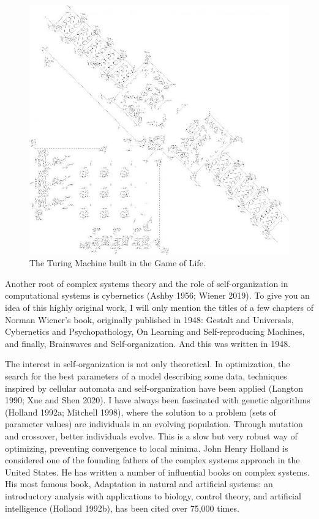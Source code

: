 \documentclass[
  a4paper,
  DIV=11,
  numbers=noendperiod]{scrreprt}
\begin{document}
\begin{figure}

{\centering \includegraphics{media/ch5n/image4.jpg}

}

\caption{\label{fig-ch5n-img4-old-42}The Turing Machine built in the
Game of Life.}

\end{figure}

Another root of complex systems theory and the role of self-organization
in computational systems is cybernetics (Ashby 1956; Wiener 2019). To
give you an idea of this highly original work, I will only mention the
titles of a few chapters of Norman Wiener's book, originally published
in 1948: Gestalt and Universals, Cybernetics and Psychopathology, On
Learning and Self-reproducing Machines, and finally, Brainwaves and
Self-organization. And this was written in 1948.

The interest in self-organization is not only theoretical. In
optimization, the search for the best parameters of a model describing
some data, techniques inspired by cellular automata and
self-organization have been applied (Langton 1990; Xue and Shen 2020). I
have always been fascinated with genetic algorithms (Holland 1992a;
Mitchell 1998), where the solution to a problem (sets of parameter
values) are individuals in an evolving population. Through mutation and
crossover, better individuals evolve. This is a slow but very robust way
of optimizing, preventing convergence to local minima. John Henry
Holland is considered one of the founding fathers of the complex systems
approach in the United States. He has written a number of influential
books on complex systems. His most famous book, Adaptation in natural
and artificial systems: an introductory analysis with applications to
biology, control theory, and artificial intelligence (Holland 1992b),
has been cited over 75,000 times.
\end{document}
